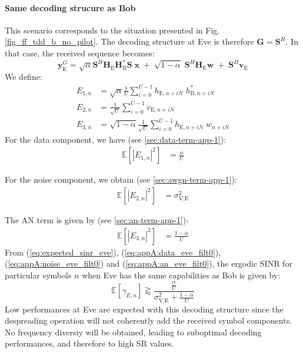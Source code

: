 \documentclass[journal,comsoc]{IEEEtran}
\newcommand{\EX}[1]{\mathbb{E} \left[#1\right]}%
\newcommand{\HE}{\textbf{H}_{\text{E}}}
\newcommand{\ve}{\textbf{v}_{\text{E}}}
\newcommand{\spread}{\textbf{S}}
\newcommand{\w}{\textbf{w}}
\begin{document}
\paragraph{Same decoding strucure as Bob}
\label{sec:same-decoding-strucure-as-bob}
This scenario corresponds to the situation presented in Fig.\ref{fig_ff_tdd_b_no_pilot}. The decoding structure at Eve is therefore $\textbf{G}=\spread^H$. In that case, the received sequence becomes:
\begin{equation}
\textbf{y}_{\text{E}}^G = \sqrt{\alpha} \spread^H \HE \textbf{H}^*_{\text{B}} \spread\; \textbf{x} \; +  \; \sqrt{1-\alpha} \; \spread^H \HE \w  \; +  \; \spread^H  \ve 
\label{eq:rx_eve_filt0}
\end{equation}
We define:
\begin{equation}
\begin{split}
E_{1,n} &= \sqrt{\alpha}\frac{1}{U}\sum_{i=0}^{U-1}  h_{\text{E}, n + iN} \; h^*_{\text{B}, n + iN} \\
E_{2,n} &= \frac{1}{\sqrt{U}}\sum_{i=0}^{U-1}  v_{\text{E}, n + iN}\\
E_{3,n} &= \sqrt{1-\alpha}\frac{1}{\sqrt{U}}\sum_{i=0}^{U-1}  h_{\text{E}, n + iN} \; w_{n + iN}
\end{split}
\end{equation}
For the data component, we have (see \ref{sec:data-term-app-1}):
\begin{equation}
	\begin{split}
	\EX{|E_{1,n}|^2}&= \frac{\alpha}{U}
	\end{split}
	\label{eq:appA:data_eve_filt0}
\end{equation}

For the noise component, we obtain (see \ref{sec:awgn-term-app-1}):
\begin{equation}
	\begin{split}
	\EX{|E_{2,n}|^2} &=\sigma^2_{\text{V,E}}
	\end{split}
	\label{eq:appA:noise_eve_filt0}
\end{equation}

The AN term is given by (see \ref{sec:an-term-app-1}):
\begin{equation}
	\begin{split}
	\EX{|E_{3,n}|^2}  &= \frac{1-\alpha}{U}
	\end{split}
	\label{eq:appA:an_eve_filt0}
\end{equation}
From (\ref{eq:expected_sinr_eve}), (\ref{eq:appA:data_eve_filt0}), (\ref{eq:appA:noise_eve_filt0}) and (\ref{eq:appA:an_eve_filt0}), the ergodic SINR for particular symbols $n$ when Eve has the same capabilities as Bob is given by:
\begin{equation}
\EX{\gamma_{E,n}} \gtrapprox \frac{\frac{\alpha}{U}}{\sigma^2_{\text{V,E}}+\frac{1-\alpha}{U}}
\label{eq:sinr_eve_filt0}
\end{equation}
Low performances at Eve are expected with this decoding structure since the despreading operation will not coherently add the received symbol components. No frequency diversiy will be obtained, leading to suboptimal decoding performances, and therefore to high SR values. 
\end{document}
